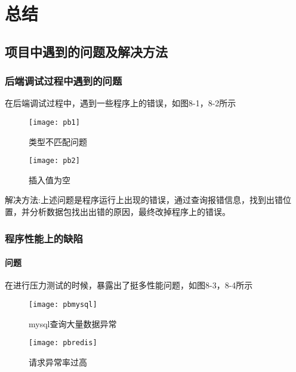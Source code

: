 \chapter{总结}

\section{项目中遇到的问题及解决方法}
\subsection{后端调试过程中遇到的问题}

在后端调试过程中，遇到一些程序上的错误，如图8-1，8-2所示
\begin{figure}[htbp]
	\centering
	\texttt{[image: pb1]}
	\caption{类型不匹配问题}\label{fig:8.1}
	\vspace{\baselineskip}
\end{figure}

\begin{figure}[htbp]
	\centering
	\texttt{[image: pb2]}
	\caption{插入值为空}\label{fig:8.2}
	\vspace{\baselineskip}
\end{figure}

解决方法:上述问题是程序运行上出现的错误，通过查询报错信息，找到出错位置，并分析数据包找出出错的原因，最终改掉程序上的错误。

\subsection{程序性能上的缺陷}
\subsubsection{问题}
在进行压力测试的时候，暴露出了挺多性能问题，如图8-3，8-4所示

\begin{figure}[htbp]
	\centering
	\texttt{[image: pbmysql]}
	\caption{mysql查询大量数据异常}\label{fig:8.3}
	\vspace{\baselineskip}
\end{figure}

\begin{figure}[htbp]
	\centering
	\texttt{[image: pbredis]}
	\caption{请求异常率过高}\label{fig:8.4}
	\vspace{\baselineskip}
\end{figure}

